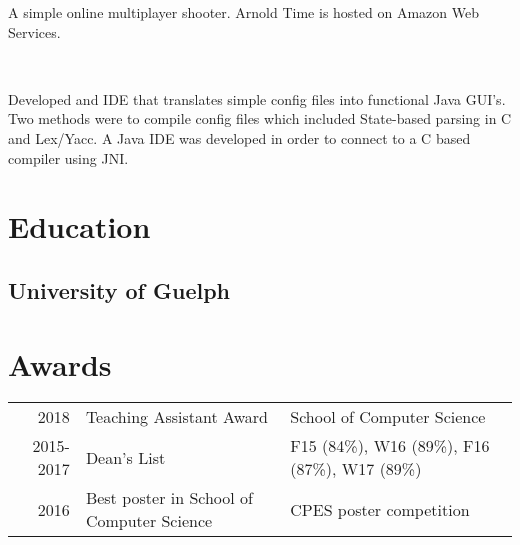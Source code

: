 \documentclass[]{chris_katsaras_resume}
\begin{document}
\begin{minipage}[t]{1\textwidth}
\vspace{2mm}
\begin{tightemize}
\item A simple online multiplayer shooter. Arnold Time is hosted on Amazon Web Services.
\end{tightemize}

\sectionsep

\\
\vspace{2mm}
\begin{tightemize}
\item Developed and IDE that translates simple config files into functional Java GUI’s. Two methods were to compile config files which included State-based parsing in C and Lex/Yacc. A Java IDE was developed in order to connect to a C based compiler using JNI.
\end{tightemize}

\sectionsep

\section{Education} 

\subsection{University of Guelph}
\sectionsep


\section{Awards} 
\begin{tabular}{rll}
2018         & Teaching Assistant Award &  School of Computer Science\\
2015-2017    & Dean's List  &  F15 (84\%), W16 (89\%),  F16 (87\%), W17 (89\%)\\
2016	     & Best poster in School of Computer Science & CPES poster competition \\

\end{tabular}

\end{minipage} 
\end{document}
